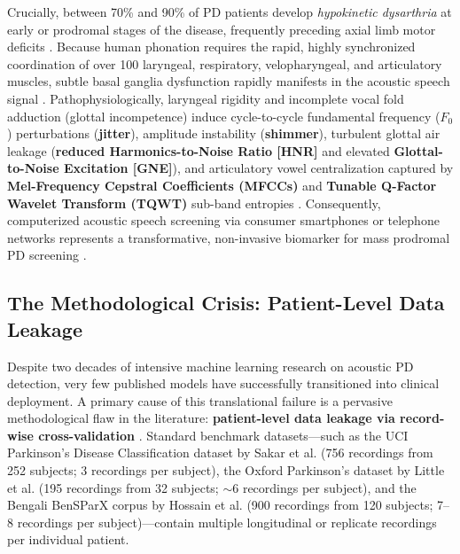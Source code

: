 \documentclass[journal,10pt,twoside]{IEEEtran}
\begin{document}
Crucially, between 70\% and 90\% of PD patients develop \textit{hypokinetic dysarthria} at early or prodromal stages of the disease, frequently preceding axial limb motor deficits \cite{ref41,ref42,ref44}. Because human phonation requires the rapid, highly synchronized coordination of over 100 laryngeal, respiratory, velopharyngeal, and articulatory muscles, subtle basal ganglia dysfunction rapidly manifests in the acoustic speech signal \cite{ref36,ref41}. Pathophysiologically, laryngeal rigidity and incomplete vocal fold adduction (glottal incompetence) induce cycle-to-cycle fundamental frequency ($F_0$) perturbations (\textbf{jitter}), amplitude instability (\textbf{shimmer}), turbulent glottal air leakage (\textbf{reduced Harmonics-to-Noise Ratio [HNR]} and elevated \textbf{Glottal-to-Noise Excitation [GNE]}), and articulatory vowel centralization captured by \textbf{Mel-Frequency Cepstral Coefficients (MFCCs)} and \textbf{Tunable Q-Factor Wavelet Transform (TQWT)} sub-band entropies \cite{ref1,ref3,ref45}. Consequently, computerized acoustic speech screening via consumer smartphones or telephone networks represents a transformative, non-invasive biomarker for mass prodromal PD screening \cite{ref5,ref43}.

\subsection{The Methodological Crisis: Patient-Level Data Leakage}
Despite two decades of intensive machine learning research on acoustic PD detection, very few published models have successfully transitioned into clinical deployment. A primary cause of this translational failure is a pervasive methodological flaw in the literature: \textbf{patient-level data leakage via record-wise cross-validation} \cite{ref33,ref34,ref35}. Standard benchmark datasets---such as the UCI Parkinson's Disease Classification dataset by Sakar et al. \cite{ref1} (756 recordings from 252 subjects; 3 recordings per subject), the Oxford Parkinson's dataset by Little et al. \cite{ref3} (195 recordings from 32 subjects; $\sim 6$ recordings per subject), and the Bengali BenSParX corpus by Hossain et al. \cite{ref5} (900 recordings from 120 subjects; 7--8 recordings per subject)---contain multiple longitudinal or replicate recordings per individual patient.
\end{document}
